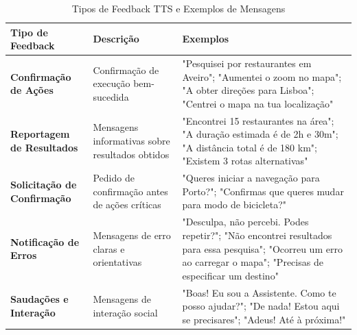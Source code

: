 \documentclass{report}
\begin{document}
\begin{longtable}{p{} p{} p{}}
    \caption{Tipos de Feedback TTS e Exemplos de Mensagens} 
    \label{tab:feedback_tts} \\
    
    \toprule
    \textbf{Tipo de Feedback} & \textbf{Descrição} & \textbf{Exemplos} \\
    \midrule
    \endfirsthead
    \endlastfoot
    
    
    \textbf{Confirmação de Ações} & 
    Confirmação de execução bem-sucedida & 
    "Pesquisei por restaurantes em Aveiro"; 
    "Aumentei o zoom no mapa"; 
    "A obter direções para Lisboa"; 
    "Centrei o mapa na tua localização" \\
    \midrule
    
    \textbf{Reportagem de Resultados} & 
    Mensagens informativas sobre resultados obtidos & 
    "Encontrei 15 restaurantes na área"; 
    "A duração estimada é de 2h e 30m"; 
    "A distância total é de 180 km";
    "Existem 3 rotas alternativas" \\
    \midrule
    
    \textbf{Solicitação de Confirmação} & 
    Pedido de confirmação antes de ações críticas & 
    "Queres iniciar a navegação para Porto?"; 
    "Confirmas que queres mudar para modo de bicicleta?" \\
    \midrule
    
    \textbf{Notificação de Erros} & 
    Mensagens de erro claras e orientativas & 
    "Desculpa, não percebi. Podes repetir?"; 
    "Não encontrei resultados para essa pesquisa"; 
    "Ocorreu um erro ao carregar o mapa"; 
    "Precisas de especificar um destino" \\
    \midrule
    
    \textbf{Saudações e Interação} & 
    Mensagens de interação social & 
    "Boas! Eu sou a Assistente. Como te posso ajudar?"; 
    "De nada! Estou aqui se precisares"; 
    "Adeus! Até à próxima!" \\
    
    \bottomrule
\end{longtable}
\end{document}
